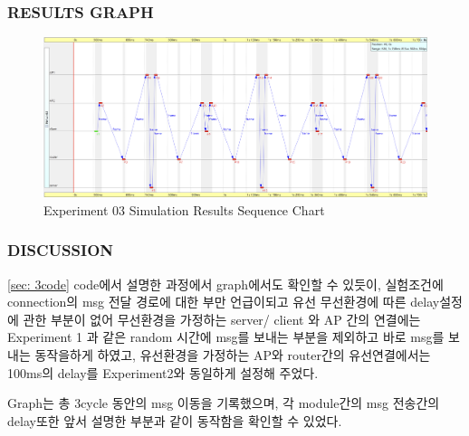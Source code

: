         \subsubsection{RESULTS GRAPH}
            \vspace{-4mm}
            \begin{figure}[!h]\centering 
            	\includegraphics[width=.99\textwidth]{image/week10/3-2.png}
            	\caption{\footnotesize
            	Experiment 03 Simulation Results Sequence Chart}
            	\vspace{-10pt}
            \end{figure}
            \vspace{-4mm}
        \subsubsection{DISCUSSION}
        \ref{sec: 3code} code에서 설명한 과정에서 graph에서도 확인할 수 있듯이, 실험조건에 connection의 msg 전달 경로에 대한 부만 언급이되고 유선 무선환경에 따른 delay설정에 관한 부분이 없어 무선환경을 가정하는 server/ client 와 AP 간의 연결에는 Experiment 1 과 같은 random 시간에 msg를 보내는 부분을 제외하고 바로 msg를 보내는 동작을하게 하였고, 유선환경을 가정하는 AP와 router간의 유선연결에서는 100ms의 delay를 Experiment2와 동일하게 설정해 주었다. 
        
        Graph는 총 3cycle 동안의 msg 이동을 기록했으며, 각 module간의 msg 전송간의 delay또한 앞서 설명한 부분과 같이 동작함을 확인할 수 있었다. 